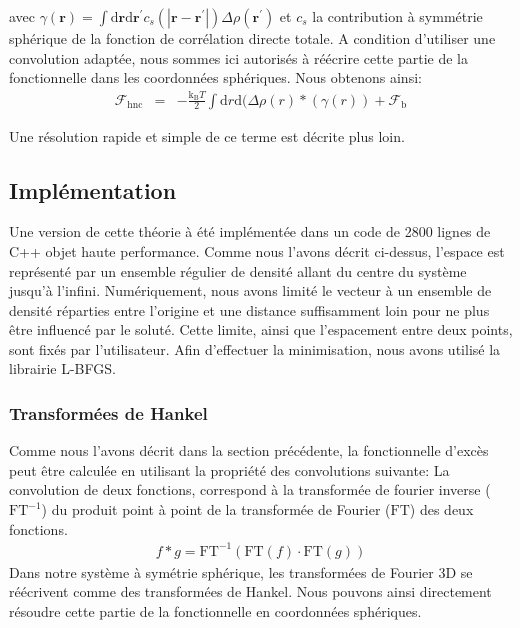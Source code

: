  avec $\gamma(\boldsymbol{r}) = \int\mathrm{d}\boldsymbol{r}\mathrm{d}\boldsymbol{r}^\prime c_s\left( \left|\boldsymbol{r}-\boldsymbol{r}^\prime\right| \right) \Delta\rho\left( \boldsymbol{r}^\prime  \right)$ et $c_s$ la contribution à symmétrie sphérique de la fonction de corrélation directe totale. A condition d'utiliser une convolution adaptée, nous sommes ici autorisés à réécrire cette partie de la fonctionnelle dans les coordonnées sphériques. Nous obtenons ainsi:
\begin{eqnarray}
\mathcal{F}_\mathrm{hnc} &=& -\frac{\mathrm{k_B}T}{2} \int \mathrm{d} r \mathrm{d} ( \Delta\rho\left( r \right)  \ast ( \gamma(r)  ) + \mathcal{F}_\mathrm{b}
\end{eqnarray}

Une résolution rapide et simple de ce terme est décrite plus loin.




\subsection{Implémentation}
Une version de cette théorie à été implémentée dans un code de 2800 lignes de C++ objet haute performance. Comme nous l'avons décrit ci-dessus, l'espace est représenté par un ensemble régulier de densité allant du centre du système jusqu'à l'infini. Numériquement, nous avons limité le vecteur à un ensemble de densité réparties entre l'origine et une distance suffisamment loin pour ne plus être influencé par le soluté. Cette limite, ainsi que l'espacement entre deux points, sont fixés par l'utilisateur.
Afin d'effectuer la minimisation, nous avons utilisé la librairie L-BFGS\cite{zhu_algorithm_1997}.

\subsubsection{Transformées de Hankel}
Comme nous l'avons décrit dans la section précédente, la fonctionnelle d'excès peut être calculée en utilisant la propriété des convolutions suivante: La convolution de deux fonctions, correspond à la transformée de fourier inverse ($\mathrm{FT}^{-1}$) du produit point à point de la transformée de Fourier ($\mathrm{FT}$) des deux fonctions.
\begin{eqnarray}
f \ast g  = \mathrm{FT}^{-1}( \mathrm{FT}(f)\cdot\mathrm{FT}(g) )
\end{eqnarray}
Dans notre système à symétrie sphérique, les transformées de Fourier 3D se réécrivent comme des transformées de Hankel. Nous pouvons ainsi directement résoudre cette partie de la fonctionnelle en coordonnées sphériques.



